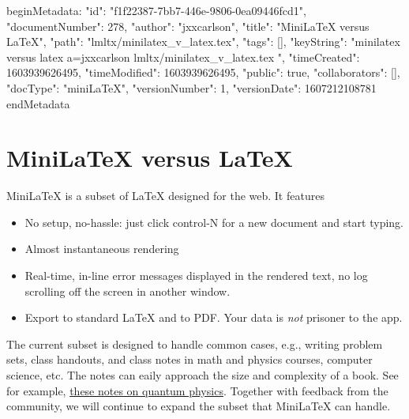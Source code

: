 beginMetadata:
{
    "id": "f1f22387-7bb7-446e-9806-0ea09446fcd1",
    "documentNumber": 278,
    "author": "jxxcarlson",
    "title": "MiniLaTeX versus LaTeX",
    "path": "lmltx/minilatex_v_latex.tex",
    "tags": [],
    "keyString": "minilatex versus latex a=jxxcarlson lmltx/minilatex_v_latex.tex ",
    "timeCreated": 1603939626495,
    "timeModified": 1603939626495,
    "public": true,
    "collaborators": [],
    "docType": "miniLaTeX",
    "versionNumber": 1,
    "versionDate": 1607212108781
}
endMetadata

\setcounter{section}{6}

\section{MiniLaTeX versus LaTeX}

MiniLaTeX is a  subset of LaTeX designed for the web.  It features 

\begin{itemize}

\item No setup, no-hassle: just click control-N for a new document and start typing.  

\item Almost instantaneous rendering

\item Real-time, in-line error messages displayed in the rendered text, no log scrolling off the screen in another window.

\item Export to standard LaTeX and to PDF.  Your data is \emph{not} prisoner to the app.

\end{itemize}

The current subset is designed to handle common cases, e.g., writing problem sets, class handouts, and class notes in math and physics courses, computer science, etc.  The notes can eaily approach the size and complexity of a book.  See for example, \href{uuid:6f5a573d-5603-4470-8dc9-b0972997a6e6}{these  notes on quantum physics}.  Together with feedback from the community, we will continue to expand the subset that MiniLaTeX can handle.

